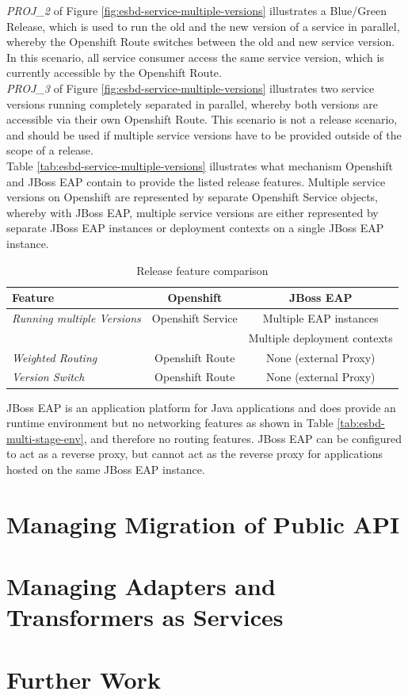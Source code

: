 \emph{PROJ\_2} of Figure \vref{fig:esbd-service-multiple-versions} illustrates a Blue/Green Release, which is used to run the old and the new version of a service in parallel, whereby the Openshift Route switches between the old and new service version. In this scenario, all service consumer access the same service version, which is currently accessible by the Openshift Route. \\

\emph{PROJ\_3} of Figure \vref{fig:esbd-service-multiple-versions} illustrates two service versions running completely separated in parallel, whereby both versions are accessible via their own Openshift Route. This scenario is not a release scenario, and should be used if multiple service versions have to be provided outside of the scope of a release. \\

Table \vref{tab:esbd-service-multiple-versions} illustrates what mechanism Openshift and JBoss EAP contain to provide the listed release features. Multiple service versions on Openshift are represented by separate Openshift Service objects, whereby with JBoss EAP, multiple service versions are either represented by separate JBoss EAP instances or deployment contexts on a single JBoss EAP instance.

{\renewcommand{\arraystretch}{1.2}%
	\begin{table}[h]
		\begin{tabularx}{\textwidth}{ m|c|c }	
			\textbf{Feature}                  & \textbf{Openshift}      & \textbf{JBoss EAP} \\  \hline
			\textit{Running multiple Versions}& Openshift Service       & Multiple EAP instances \\
																	   && Multiple deployment contexts \\ \hline
			\textit{Weighted Routing}         & Openshift Route         & None (external Proxy) \\  \hline
			\textit{Version Switch}           & Openshift Route         & None (external Proxy) \\  \hline
		\end{tabularx}
		\caption{Release feature comparison}
		\label{tab:esbd-service-multiple-versions}
\end{table}}

JBoss EAP is an application platform for Java applications and does provide an runtime environment but no networking features as shown in Table \vref{tab:esbd-multi-stage-env}, and therefore no routing features. JBoss EAP can be configured to act as a reverse proxy, but cannot act as the reverse proxy for applications hosted on the same JBoss EAP instance. 

\section{Managing Migration of Public API}
\label{sec:esbd-multi-stage-env}

\section{Managing Adapters and Transformers as Services}
\label{sec:esbd-adap-trans-service}


\section{Further Work}
\label{sec:esbd-furhter-work}